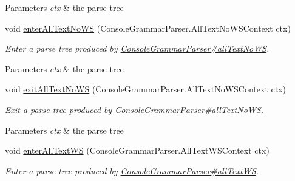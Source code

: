 \begin{DoxyCompactItemize}
\begin{DoxyCompactList}
\begin{DoxyParams}{Parameters}
{\em ctx} & the parse tree\\
\hline
\end{DoxyParams}
 \end{DoxyCompactList}\item 
void \hyperlink{classgov_1_1nasa_1_1jpf_1_1inspector_1_1client_1_1parser_1_1_console_grammar_base_listener_a3b1dbbf124355205f4bb1b8a7e902b46}{enter\+All\+Text\+No\+WS} (Console\+Grammar\+Parser.\+All\+Text\+No\+W\+S\+Context ctx)
\begin{DoxyCompactList}\small\item\em Enter a parse tree produced by \hyperlink{classgov_1_1nasa_1_1jpf_1_1inspector_1_1client_1_1parser_1_1_console_grammar_parser_ac1f61b1a3d9917fc0f0920f3274d5b22}{Console\+Grammar\+Parser\#all\+Text\+No\+WS}.


\begin{DoxyParams}{Parameters}
{\em ctx} & the parse tree\\
\hline
\end{DoxyParams}
 \end{DoxyCompactList}\item 
void \hyperlink{classgov_1_1nasa_1_1jpf_1_1inspector_1_1client_1_1parser_1_1_console_grammar_base_listener_a6124dcdf68910ebe563b9b406a9686b8}{exit\+All\+Text\+No\+WS} (Console\+Grammar\+Parser.\+All\+Text\+No\+W\+S\+Context ctx)
\begin{DoxyCompactList}\small\item\em Exit a parse tree produced by \hyperlink{classgov_1_1nasa_1_1jpf_1_1inspector_1_1client_1_1parser_1_1_console_grammar_parser_ac1f61b1a3d9917fc0f0920f3274d5b22}{Console\+Grammar\+Parser\#all\+Text\+No\+WS}.


\begin{DoxyParams}{Parameters}
{\em ctx} & the parse tree\\
\hline
\end{DoxyParams}
 \end{DoxyCompactList}\item 
void \hyperlink{classgov_1_1nasa_1_1jpf_1_1inspector_1_1client_1_1parser_1_1_console_grammar_base_listener_a1b860bd36856ff43f36be66c167684f7}{enter\+All\+Text\+WS} (Console\+Grammar\+Parser.\+All\+Text\+W\+S\+Context ctx)
\begin{DoxyCompactList}\small\item\em Enter a parse tree produced by \hyperlink{classgov_1_1nasa_1_1jpf_1_1inspector_1_1client_1_1parser_1_1_console_grammar_parser_adc161fc81eedd939154fd25e889f5b28}{Console\+Grammar\+Parser\#all\+Text\+WS}.



\end{DoxyCompactList}
\end{DoxyCompactItemize}
